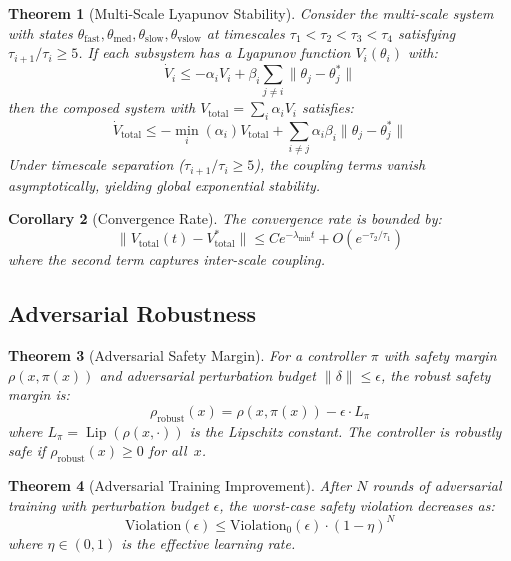 \documentclass[11pt,twocolumn]{article}
\newtheorem{theorem}{Theorem}[section]
\newtheorem{corollary}[theorem]{Corollary}
\theoremstyle{definition}
\DeclareMathOperator{\Lip}{Lip}
\begin{document}
\begin{theorem}[Multi-Scale Lyapunov Stability]
\label{thm:multiscale}
Consider the multi-scale system with states $\theta_{\text{fast}}, \theta_{\text{med}}, \theta_{\text{slow}}, \theta_{\text{vslow}}$ at timescales $\tau_1 < \tau_2 < \tau_3 < \tau_4$ satisfying $\tau_{i+1}/\tau_i \geq 5$. If each subsystem has a Lyapunov function $V_i(\theta_i)$ with:
\begin{equation}
\dot{V}_i \leq -\alpha_i V_i + \beta_i \sum_{j \neq i} \|\theta_j - \theta_j^*\|
\end{equation}
then the composed system with $V_{\text{total}} = \sum_i \alpha_i V_i$ satisfies:
\begin{equation}
\dot{V}_{\text{total}} \leq -\min_i(\alpha_i) V_{\text{total}} + \sum_{i \neq j} \alpha_i \beta_i \|\theta_j - \theta_j^*\|
\end{equation}
Under timescale separation ($\tau_{i+1}/\tau_i \geq 5$), the coupling terms vanish asymptotically, yielding global exponential stability.
\end{theorem}

\begin{corollary}[Convergence Rate]
\label{cor:convergence}
The convergence rate is bounded by:
\begin{equation}
\|V_{\text{total}}(t) - V_{\text{total}}^*\| \leq C e^{-\lambda_{\min} t} + O(e^{-\tau_2/\tau_1})
\end{equation}
where the second term captures inter-scale coupling.
\end{corollary}

\subsection{Adversarial Robustness}

\begin{theorem}[Adversarial Safety Margin]
\label{thm:adversarial}
For a controller $\pi$ with safety margin $\rho(x, \pi(x))$ and adversarial perturbation budget $\|\delta\| \leq \epsilon$, the robust safety margin is:
\begin{equation}
\rho_{\text{robust}}(x) = \rho(x, \pi(x)) - \epsilon \cdot L_\pi
\end{equation}
where $L_\pi = \Lip(\rho(x, \cdot))$ is the Lipschitz constant. The controller is robustly safe if $\rho_{\text{robust}}(x) \geq 0$ for all~$x$.
\end{theorem}

\begin{theorem}[Adversarial Training Improvement]
\label{thm:adv_training}
After $N$ rounds of adversarial training with perturbation budget $\epsilon$, the worst-case safety violation decreases as:
\begin{equation}
\text{Violation}(\epsilon) \leq \text{Violation}_0(\epsilon) \cdot (1 - \eta)^N
\end{equation}
where $\eta \in (0, 1)$ is the effective learning rate.
\end{theorem}
\end{document}
